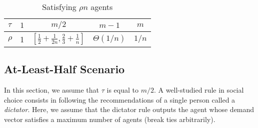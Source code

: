 \documentclass{article}
\begin{document}
\begin{table}
\begin{center}
\begin{tabular}{l|cccc}
$\tau$&$1$&$m/2$&$m-1$&$m$\\
\hline
$\rho$&1&$[\frac{1}{2}+\frac{1}{2n}, \frac{2}{3}+\frac{1}{n}]$&$\Theta(1/n)$& $1/n$\\
\end{tabular}
\caption{\label{tab_rho_HALF} Satisfying $\rho n$ agents}
\end{center}
\end{table}




\subsection{At-Least-Half Scenario}

\label{sec:wcf:half}









In this section, we assume that $\tau$ is equal to $m/2$. A well-studied rule in social choice  consists in 
following the recommendations of a single person called a  \emph{dictator}. Here, we assume that the {\sc dictator} rule outputs the agent whose demand vector satisfies a maximum number of agents (break ties arbitrarily). 
\end{document}
